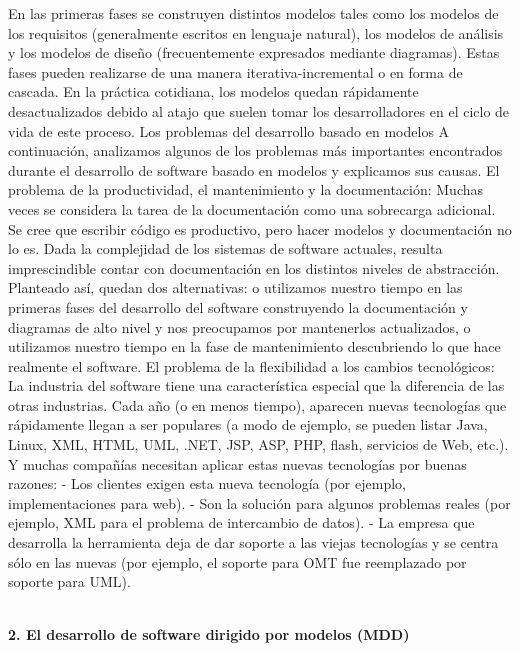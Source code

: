 \begin{flushleft}
\begin{itemize}
En las primeras fases se construyen distintos modelos tales como los modelos de los requisitos (generalmente escritos en lenguaje natural), los modelos de análisis y los modelos de diseño (frecuentemente expresados mediante diagramas). Estas fases pueden realizarse de una manera iterativa-incremental o en forma de cascada. En la práctica cotidiana, los modelos quedan rápidamente desactualizados debido al atajo que suelen tomar los desarrolladores en el ciclo de vida de este proceso.
Los problemas del desarrollo basado en modelos 
A continuación, analizamos algunos de los problemas más importantes encontrados durante el desarrollo de software basado en modelos y explicamos sus causas.
El problema de la productividad, el mantenimiento y la documentación: Muchas veces se considera la tarea de la documentación como una sobrecarga adicional. Se cree que escribir código es productivo, pero hacer modelos y documentación no lo es. Dada la complejidad de los sistemas de software actuales, resulta imprescindible contar con documentación en los distintos niveles de abstracción. Planteado así, quedan dos alternativas: o utilizamos nuestro tiempo en las primeras fases del desarrollo del software construyendo la documentación y diagramas de alto nivel y nos preocupamos por mantenerlos actualizados, o utilizamos nuestro tiempo en la fase de mantenimiento descubriendo lo que hace realmente el software.
El problema de la flexibilidad a los cambios tecnológicos: La industria del software tiene una característica especial que la diferencia de las otras industrias. Cada año (o en menos tiempo), aparecen nuevas tecnologías que rápidamente llegan a ser populares (a modo de ejemplo, se pueden listar Java, Linux, XML, HTML, UML, .NET, JSP, ASP, PHP, flash, servicios de Web, etc.). Y muchas compañías necesitan aplicar estas nuevas tecnologías por buenas razones: - Los clientes exigen esta nueva tecnología (por ejemplo, implementaciones para web). - Son la solución para algunos problemas reales (por ejemplo, XML para el problema de intercambio de datos). - La empresa que desarrolla la herramienta deja de dar soporte a las viejas tecnologías y se centra sólo en las nuevas (por ejemplo, el soporte para OMT fue reemplazado por soporte para UML).



\textbf{}\\
\textbf{2.	El desarrollo de software dirigido por modelos (MDD)}


\end{itemize}
\end{flushleft}
